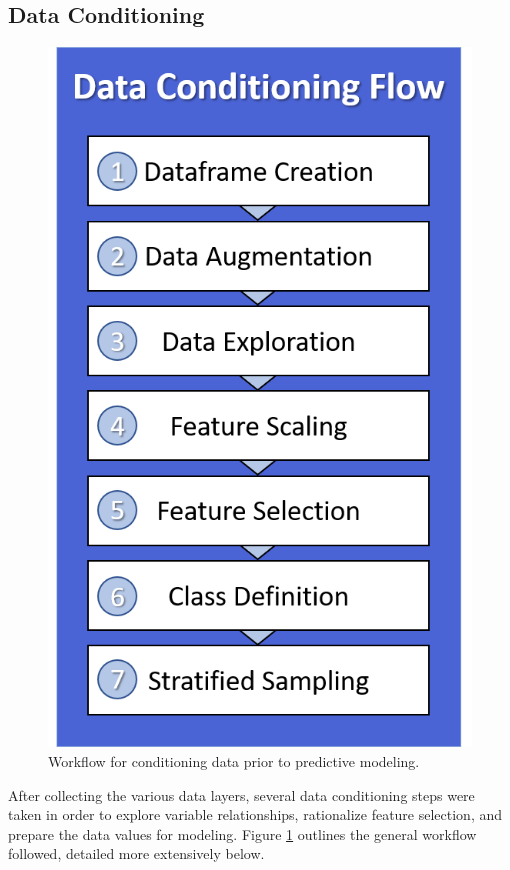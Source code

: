 \subsection{Data Conditioning}\label{ch3:conditioning}
\begin{figure}
\centering
\includegraphics[scale=0.57]{templates/images/Flow-DataConditioning.png}
\singlespacing
\caption[Data conditioning workflow]{Workflow for conditioning data prior to predictive modeling.}
\label{fig:DC_Flow}
\end{figure}
After collecting the various data layers, several data conditioning steps were taken in order to explore variable relationships, rationalize feature selection, and prepare the data values for modeling. Figure \ref{fig:DC_Flow} outlines the general workflow followed, detailed more extensively below.

